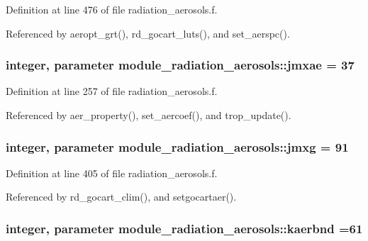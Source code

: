 Definition at line 476 of file radiation\+\_\+aerosols.\+f.



Referenced by aeropt\+\_\+grt(), rd\+\_\+gocart\+\_\+luts(), and set\+\_\+aerspc().

\subsubsection[{\texorpdfstring{jmxae}{jmxae}}]{\setlength{\rightskip}{0pt plus 5cm}integer, parameter module\+\_\+radiation\+\_\+aerosols\+::jmxae = 37\hspace{0.3cm}{\ttfamily [private]}}\hypertarget{namespacemodule__radiation__aerosols_afdfdd058364062349b02cec9c712ea80}{}\label{namespacemodule__radiation__aerosols_afdfdd058364062349b02cec9c712ea80}


Definition at line 257 of file radiation\+\_\+aerosols.\+f.



Referenced by aer\+\_\+property(), set\+\_\+aercoef(), and trop\+\_\+update().

\subsubsection[{\texorpdfstring{jmxg}{jmxg}}]{\setlength{\rightskip}{0pt plus 5cm}integer, parameter module\+\_\+radiation\+\_\+aerosols\+::jmxg = 91\hspace{0.3cm}{\ttfamily [private]}}\hypertarget{namespacemodule__radiation__aerosols_a816ee06781e63adf8752a9a67ab2da2d}{}\label{namespacemodule__radiation__aerosols_a816ee06781e63adf8752a9a67ab2da2d}


Definition at line 405 of file radiation\+\_\+aerosols.\+f.



Referenced by rd\+\_\+gocart\+\_\+clim(), and setgocartaer().

\subsubsection[{\texorpdfstring{kaerbnd}{kaerbnd}}]{\setlength{\rightskip}{0pt plus 5cm}integer, parameter module\+\_\+radiation\+\_\+aerosols\+::kaerbnd =61\hspace{0.3cm}{\ttfamily [private]}}\hypertarget{namespacemodule__radiation__aerosols_ad345c77fc29d8b02de34990162645a66}{}\label{namespacemodule__radiation__aerosols_ad345c77fc29d8b02de34990162645a66}


